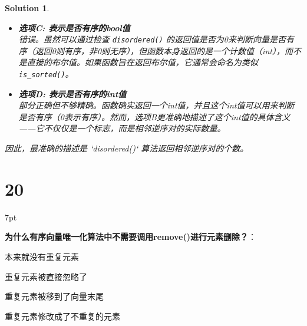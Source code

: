 \documentclass[UTF8]{report}
\newtheorem{solution}{Solution}
\theoremstyle{MyLineTheoremStyle} %
\theoremstyle{MyBlockTheoremStyle} %
\theoremstyle{MySubsubsectionStyle} %
\newenvironment{graybox}{%
        \def\FrameCommand{%
        \hspace{1pt}%
        {\color{gray}\small \vrule width 2pt}%
        {\color{graybox_color}\vrule width 4pt}%
        \colorbox{graybox_color}%
        }%
        \MakeFramed{\advance\hsize-\width\FrameRestore}%
        \noindent\hspace{-4.55pt}%
        \begin{adjustwidth}{}{7pt}%
        \vspace{2pt}\vspace{2pt}%
        }
        {%
        \vspace{2pt}\end{adjustwidth}\endMakeFramed%
        }
\begin{document}
\begin{solution}
\begin{itemize}
    \item \textbf{选项C: 表示是否有序的bool值} \\
    错误。虽然可以通过检查 \texttt{disordered()} 的返回值是否为0来判断向量是否有序（返回0则有序，非0则无序），但函数本身返回的是一个计数值（int），而不是直接的布尔值。如果函数旨在返回布尔值，它通常会命名为类似 \texttt{is\_sorted()}。

    \item \textbf{选项D: 表示是否有序的int值} \\
    部分正确但不够精确。函数确实返回一个int值，并且这个int值可以用来判断是否有序（0表示有序）。然而，选项B更准确地描述了这个int值的具体含义——它不仅仅是一个标志，而是相邻逆序对的实际数量。
\end{itemize}
因此，最准确的描述是 `disordered()` 算法返回相邻逆序对的个数。
\end{solution}

\section*{20}

\begin{graybox}
\textbf{为什么有序向量唯一化算法中不需要调用remove()进行元素删除？}：
\begin{circledenum}
    \item 本来就没有重复元素
    \item 重复元素被直接忽略了
    \item 重复元素被移到了向量末尾
    \item 重复元素修改成了不重复的元素
\end{circledenum}
\end{graybox}
\end{document}

